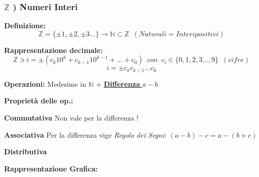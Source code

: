 \documentclass[10pt]{article}
\theoremstyle{plain}
\begin{document}
\subsubsection*{$\mathbb{Z}$ ) Numeri Interi}
        \begin{description}
            \item \textbf{Definizione: } \[\mathbb{Z} = \{\pm 1,\pm 2,\pm 3...\} \longrightarrow \mathbb{N} \subset \mathbb{Z} \enspace {(Naturali = Interi positivi)}\]
            \item \textbf{Rappresentazione decimale: }  \[\mathbb{Z} \owns i = \pm (c_k 10^k + c_{k-1} 10^{k-1} + ... + c_0) \enspace{} {con} \enspace{} c_i \in \{0,1,2,3...,9\}\enspace{} {(cifre)}\]
            \[i = \pm c_k c_{k-1} ... c_0\]
            \item \textbf{Operazioni: } Medesime in $\mathbb{N}$ + \underline{\textbf{Differenza} $a-b$}
            \item \textbf{Proprietà delle op.:}
                \begin{description}
                    \item \textbf{Commutativa} {Non vale per la differenza !}
                    \item \textbf{Associativa} {Per la differenza vige \textit{Regola dei Segni}: } $(a-b) - c = a - (b + c)$
                    \item \textbf{Distributiva} 
                \end{description}
            \item \textbf{Rappresentazione Grafica: }
            \item
            \item {}
\end{description}
\end{document}
